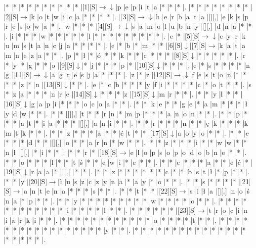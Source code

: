 \documentclass[11pt]{article}
\newcommand\drarr{$\rightarrow \!\!\!\!\! \downarrow$}
\newcommand\rarr{$\rightarrow$}
\newcommand\darr{$\downarrow$}
\begin{document}
\noindent\begin{Puzzle}{19}{33}|*	|*	|*	|*	|*	|*	|*	|*	|*	|*	|[1][S]\drarr	|p	|e	|p	|i	|t	|a	|*	|*	|*	|.
|*	|*	|*	|*	|*	|*	|*	|*	|[2][S]\rarr	|k	|o	|t	|w	|i	|c	|a	|*	|*	|*	|*	|.
|[3][S]\drarr	|h	|e	|r	|b	|a	|t	|a	|[][,]{ }	|e	|k	|s	|p	|r	|e	|s	|o	|w	|a	|*	|.
|w	|*	|*	|*	|[4][S]\drarr	|s	|a	|m	|o	|l	|u	|b	|n	|y	|[][,]{ }	|d	|n	|a	|*	|*	|.
|i	|*	|*	|*	|w	|*	|*	|*	|*	|*	|l	|*	|*	|*	|*	|*	|*	|*	|*	|*	|.
|c	|*	|[5][S]\drarr	|c	|y	|r	|k	|u	|m	|s	|t	|a	|n	|c	|j	|a	|*	|*	|*	|*	|.
|e	|*	|b	|*	|m	|*	|*	|[6][S]\darr	|[7][S]\rarr	|k	|a	|t	|a	|m	|n	|e	|z	|a	|*	|*	|.
|p	|*	|ł	|*	|ó	|*	|*	|k	|*	|*	|c	|*	|*	|*	|[8][S]\darr	|*	|*	|*	|*	|*	|.
|r	|*	|y	|*	|g	|*	|*	|o	|[9][S]\darr	|*	|j	|*	|*	|*	|p	|*	|[10][S]\darr	|*	|*	|*	|.
|e	|*	|s	|*	|*	|*	|*	|n	|g	|[11][S]\drarr	|a	|g	|r	|e	|s	|j	|a	|*	|*	|*	|.
|z	|*	|z	|[12][S]\drarr	|f	|e	|s	|t	|o	|n	|*	|*	|*	|*	|z	|*	|n	|[13][S]\darr	|*	|*	|.
|e	|*	|c	|b	|*	|*	|*	|y	|f	|i	|*	|*	|*	|*	|c	|*	|o	|t	|*	|*	|.
|s	|*	|z	|a	|*	|*	|*	|n	|r	|e	|[14][S]\darr	|*	|*	|*	|z	|[15][S]\darr	|m	|r	|*	|*	|.
|*	|*	|y	|l	|*	|*	|[16][S]\darr	|g	|a	|p	|i	|*	|*	|*	|o	|c	|o	|a	|*	|*	|.
|*	|*	|k	|e	|*	|*	|g	|e	|*	|a	|m	|*	|*	|*	|ł	|y	|d	|w	|*	|*	|.
|*	|*	|[][,]{ }	|t	|*	|*	|r	|n	|*	|m	|p	|*	|*	|*	|a	|n	|o	|n	|*	|*	|.
|*	|*	|p	|*	|*	|*	|a	|t	|*	|i	|a	|*	|*	|*	|[][,]{ }	|a	|n	|i	|*	|*	|.
|*	|*	|r	|*	|*	|*	|n	|*	|*	|ę	|k	|*	|*	|*	|k	|m	|t	|k	|*	|*	|.
|*	|*	|z	|*	|*	|*	|a	|*	|*	|ć	|t	|*	|*	|[17][S]\darr	|a	|o	|y	|o	|*	|*	|.
|*	|*	|e	|*	|*	|*	|d	|*	|*	|[][,]{ }	|o	|*	|*	|a	|r	|n	|*	|w	|*	|*	|.
|*	|*	|z	|*	|*	|*	|i	|*	|*	|w	|w	|*	|*	|n	|ł	|[][,]{ }	|*	|i	|*	|*	|.
|*	|*	|r	|*	|[18][S]\rarr	|e	|l	|o	|p	|s	|o	|p	|o	|d	|o	|b	|n	|e	|*	|*	|.
|*	|*	|o	|*	|*	|*	|l	|*	|*	|t	|ś	|*	|*	|e	|w	|i	|*	|c	|*	|*	|.
|*	|*	|c	|*	|*	|*	|a	|*	|*	|e	|ć	|*	|[19][S]\darr	|r	|a	|a	|*	|[][,]{ }	|*	|*	|.
|*	|*	|z	|*	|*	|*	|*	|*	|*	|c	|*	|*	|b	|s	|t	|ł	|*	|p	|*	|*	|.
|*	|*	|y	|[20][S]\rarr	|ł	|u	|s	|z	|c	|z	|y	|n	|a	|*	|a	|y	|*	|o	|*	|*	|.
|*	|*	|s	|*	|*	|*	|*	|[21][S]\rarr	|a	|n	|t	|e	|n	|a	|*	|*	|*	|s	|*	|*	|.
|*	|*	|t	|*	|*	|[22][S]\rarr	|s	|i	|ł	|a	|[][,]{ }	|n	|o	|ś	|n	|a	|*	|p	|*	|*	|.
|*	|*	|y	|*	|*	|*	|*	|*	|*	|*	|*	|*	|w	|*	|*	|*	|*	|o	|*	|*	|.
|*	|*	|*	|*	|*	|*	|*	|*	|*	|*	|*	|*	|i	|*	|*	|*	|*	|l	|*	|*	|.
|*	|*	|*	|*	|*	|*	|[23][S]\rarr	|t	|r	|o	|c	|i	|n	|i	|a	|r	|k	|i	|*	|*	|.
|*	|*	|*	|*	|*	|*	|*	|*	|*	|*	|*	|*	|a	|*	|*	|*	|*	|t	|*	|*	|.
|*	|*	|*	|*	|*	|*	|*	|*	|*	|*	|*	|*	|*	|*	|*	|*	|*	|y	|*	|*	|.
|*	|*	|*	|*	|*	|*	|*	|*	|*	|*	|*	|*	|*	|*	|*	|*	|*	|*	|*	|*	|.\end{Puzzle}
\end{document}
